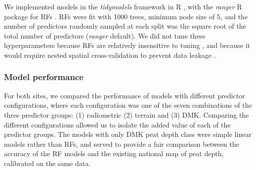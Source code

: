 \documentclass[soil, manuscript]{copernicus}
\begin{document}
We implemented models in the \emph{tidymodels} framework in R \citep{kuhnTidymodelsCollectionPackages2020}, with the \emph{ranger} R package for RFs \citep[v0.16,][]{wrightRangerFastImplementation2017}.
RFs were fit with 1000 trees, minimum node size of 5, and the number of predictors randomly sampled at each split was the square root of the total number of predictors (\emph{ranger} default).
We did not tune these hyperparameters because RFs are relatively insensitive to tuning \citep{probstHyperparametersTuningStrategies2019}, and because it would require nested spatial cross-validation to prevent data leakage \citep{schratzHyperparameterTuningPerformance2019}.

\subsubsection{Model performance}

For both sites, we compared the performance of models with different predictor configurations, where each configuration was one of the seven combinations of the three predictor groups: (1) radiometric (2) terrain and (3) DMK.
Comparing the different configurations allowed us to isolate the added value of each of the predictor groups.
The models with only DMK peat depth class were simple linear models rather than RFs, and served to provide a fair comparison between the accuracy of the RF models and the existing national map of peat depth, calibrated on the same data.
\end{document}
